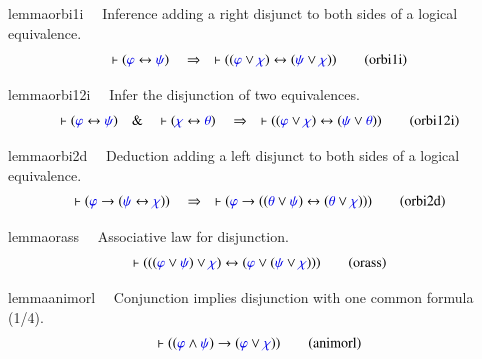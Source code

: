 \begin{restatable}{lemma}{orbi1i}~~ Inference adding a right disjunct to both
sides of a logical
       equivalence.  ~
\begin{align}
\vdash ( \mw{\varphi} \leftrightarrow \mw{\psi} )\quad\Rightarrow\quad \vdash (
    ( \mw{\varphi} \vee \mw{\chi} ) \leftrightarrow ( \mw{\psi} \vee \mw{\chi}
    ) )\label{eq:orbi1i}\tag{orbi1i}
\end{align}
\end{restatable}

\begin{restatable}{lemma}{orbi12i}~~ Infer the disjunction of two equivalences. 
~
\begin{align}
\vdash ( \mw{\varphi} \leftrightarrow \mw{\psi} )\quad\&\quad \vdash (
    \mw{\chi} \leftrightarrow \mw{\theta} )\quad\Rightarrow\quad \vdash ( (
    \mw{\varphi} \vee \mw{\chi} ) \leftrightarrow ( \mw{\psi} \vee \mw{\theta}
    ) )\label{eq:orbi12i}\tag{orbi12i}
\end{align}
\end{restatable}

\begin{restatable}{lemma}{orbi2d}~~ Deduction adding a left disjunct to both
sides of a logical equivalence.
       ~
\begin{align}
\vdash ( \mw{\varphi} \rightarrow ( \mw{\psi} \leftrightarrow \mw{\chi} )
    )\quad\Rightarrow\quad \vdash ( \mw{\varphi} \rightarrow ( ( \mw{\theta}
    \vee \mw{\psi} ) \leftrightarrow ( \mw{\theta} \vee \mw{\chi} ) )
    )\label{eq:orbi2d}\tag{orbi2d}
\end{align}
\end{restatable}

\begin{restatable}{lemma}{orass}~~ Associative law for disjunction.  
\begin{align}
\vdash ( ( ( \mw{\varphi} \vee \mw{\psi} ) \vee \mw{\chi} ) \leftrightarrow (
    \mw{\varphi} \vee ( \mw{\psi} \vee \mw{\chi} ) )
    )\label{eq:orass}\tag{orass}
\end{align}
\end{restatable}

\begin{restatable}{lemma}{animorl}~~ Conjunction implies disjunction with one
common formula (1/4).
     ~
\begin{align}
\vdash ( ( \mw{\varphi} \wedge \mw{\psi} ) \rightarrow ( \mw{\varphi} \vee
    \mw{\chi} ) )\label{eq:animorl}\tag{animorl}
\end{align}
\end{restatable}

